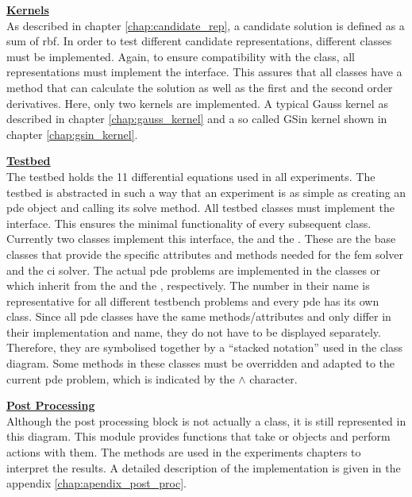 \documentclass[./\jobname.tex]{subfiles}
\begin{document}
\large \underline{\textbf{Kernels}} \\
As described in chapter \ref{chap:candidate_rep}, a candidate solution is defined as a sum of \gls{rbf}. In order to test different candidate representations, different classes must be implemented. Again, to ensure compatibility with the  class, all representations must implement the  interface. This assures that all classes have a method that can calculate the solution as well as the first and the second order derivatives. Here, only two kernels are implemented. A typical Gauss kernel as described in chapter \ref{chap:gauss_kernel} and a so called GSin kernel shown in chapter \ref{chap:gsin_kernel}. 

\large \underline{\textbf{Testbed}} \\
The testbed holds the 11 differential equations used in all experiments. The testbed is abstracted in such a way that an experiment is as simple as creating an \gls{pde} object and calling its solve method. All testbed classes must implement the  interface. This ensures the minimal functionality of every subsequent class. Currently two classes implement this interface, the  and the . These are the base classes that provide the specific attributes and methods needed for the \gls{fem} solver and the \gls{ci} solver. The actual \gls{pde} problems are implemented in the classes  or  which inherit from the  and the , respectively. The number in their name is representative for all different testbench problems and every \gls{pde} has its own class. Since all \gls{pde} classes have the same methods/attributes and only differ in their implementation and name, they do not have to be displayed separately. Therefore, they are symbolised together by a ``stacked notation'' used in the class diagram. Some methods in these classes must be overridden and adapted to the current \gls{pde} problem, which is indicated by the $\land$ character.

\large \underline{\textbf{Post Processing}} \\
Although the post processing block is not actually a class, it is still represented in this diagram. This module provides functions that take  or  objects and perform actions with them. The methods are used in the experiments chapters to interpret the results. A detailed description of the implementation is given in the appendix \ref{chap:apendix_post_proc}.
\end{document}

